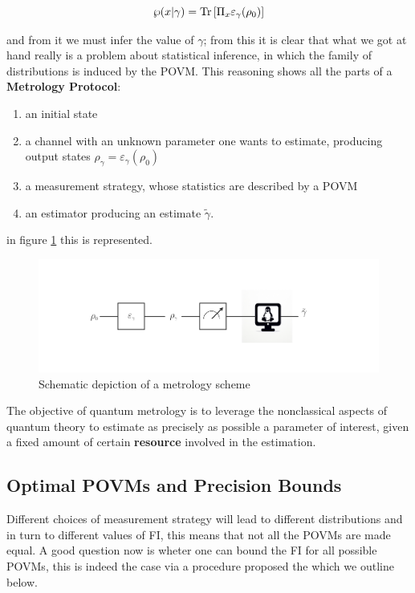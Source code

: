 \begin{equation}
  \wp(x|\gamma) = \mathrm{Tr}\left[\Pi_{x}\varepsilon_{\gamma}(\rho_{0})\right]
\end{equation}

and from it we must infer the value of $\gamma$; from this it is clear that what we got at hand
really is a problem about statistical inference, in which the family of distributions is induced by the POVM.
This reasoning shows all the parts of a \textbf{Metrology Protocol}:

\begin{enumerate}
  \item an initial state
  \item a channel with an unknown parameter one wants to estimate, producing output states $\rho_{\gamma} = \varepsilon_{\gamma}(\rho_{0})$

  \item a measurement strategy, whose statistics are described by a POVM
  \item an estimator producing an estimate $\tilde\gamma$.
\end{enumerate}
in figure \ref{fig:metrology_scheme} this is represented.

\begin{figure}[h]
  \centering
  \includegraphics[scale=0.5]{CodeImages/Esquema_Estimacion.pdf}
  \caption{Schematic depiction of a metrology scheme}
  \label{fig:metrology_scheme}
\end{figure}

The objective of quantum metrology is to leverage the nonclassical
aspects of quantum theory to estimate as precisely as possible a
parameter of interest, given a fixed amount of certain
\textbf{resource} involved in the estimation.

\subsection{Optimal POVMs and Precision Bounds}
Different choices of measurement strategy will lead to different
distributions and in turn to different values of FI, this means
that not all the POVMs are made equal. A good
question now is wheter one can bound the FI for all possible
POVMs, this is indeed the case via a procedure proposed the
\cite{braunstein_statistical_1994} which we outline below.

